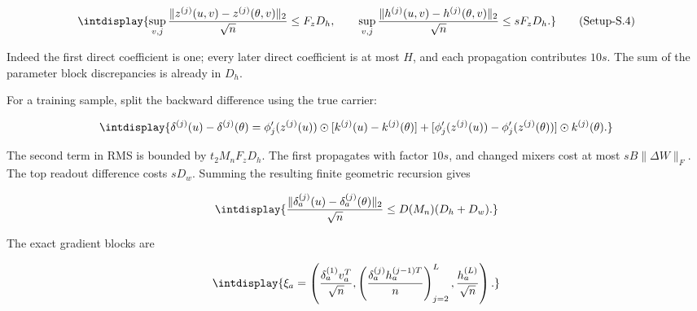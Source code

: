 \label{int:eq-setup-s-4}
\begingroup\renewcommand{\theHequation}{intdisplay.851}
\begin{equation}
\intdisplay{
\sup_{v,j}\frac{\|z^{(j)}(u,v)-z^{(j)}(\theta,v)\|_2}{\sqrt n}
 \le F_zD_h,
\qquad
\sup_{v,j}\frac{\|h^{(j)}(u,v)-h^{(j)}(\theta,v)\|_2}{\sqrt n}
 \le sF_zD_h.
}
\tag{Setup-S.4}
\label{int:eq-0415-setup-s-4}
\end{equation}
\endgroup


Indeed the first direct coefficient is one; every later direct coefficient is at most \(H\), and each propagation contributes \(10s\). The sum of the parameter block discrepancies is already in \(D_h\).



For a training sample, split the backward difference using the true carrier:


\begingroup\renewcommand{\theHequation}{intdisplay.852}
\begin{equation*}
\intdisplay{
\delta^{(j)}(u)-\delta^{(j)}(\theta)
=\phi_j'(z^{(j)}(u))\odot[k^{(j)}(u)-k^{(j)}(\theta)]
+[\phi_j'(z^{(j)}(u))-\phi_j'(z^{(j)}(\theta))]\odot k^{(j)}(\theta).
}
\end{equation*}
\endgroup


The second term in RMS is bounded by \(t_2M_nF_zD_h\). The first propagates with factor \(10s\), and changed mixers cost at most \(sB\|\Delta W\|_F\). The top readout difference costs \(sD_w\). Summing the resulting finite geometric recursion gives


\begingroup\renewcommand{\theHequation}{intdisplay.853}
\begin{equation*}
\intdisplay{
\frac{\|\delta_a^{(j)}(u)-\delta_a^{(j)}(\theta)\|_2}{\sqrt n}
\le D(M_n)(D_h+D_w).
}
\end{equation*}
\endgroup


The exact gradient blocks are


\begingroup\renewcommand{\theHequation}{intdisplay.854}
\begin{equation*}
\intdisplay{
\xi_a=
\left(\frac{\delta_a^{(1)}v_a^T}{\sqrt n},
 \left(\frac{\delta_a^{(j)}h_a^{(j-1)T}}n\right)_{j=2}^L,
 \frac{h_a^{(L)}}{\sqrt n}\right).
}
\end{equation*}
\endgroup

